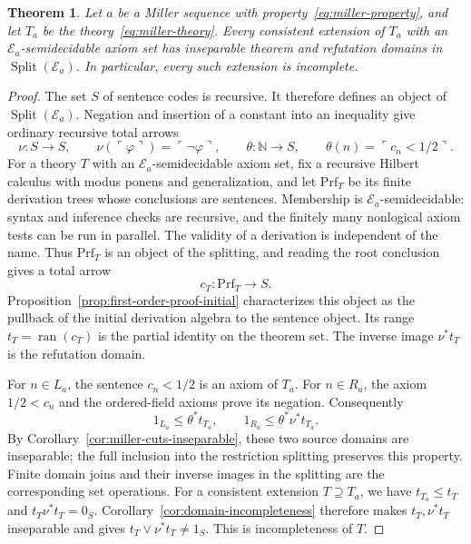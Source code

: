 \documentclass[11pt]{article}
\newtheorem{theorem}{Theorem}[section]
\newcommand{\N}{\mathbb N}
\newcommand{\ran}{\operatorname{ran}}
\begin{document}
\begin{theorem}\label{thm:miller-incompleteness}
Let $a$ be a Miller sequence with property~\eqref{eq:miller-property},
and let $T_a$ be the theory~\eqref{eq:miller-theory}.
Every consistent extension of $T_a$ with an
$\mathcal E_a$-semidecidable axiom set has inseparable theorem and
refutation domains in $\operatorname{Split}(\mathcal E_a)$.
In particular, every such extension is incomplete.
\end{theorem}
\begin{proof}
The set $S$ of sentence codes is recursive. It therefore defines an
object of $\operatorname{Split}(\mathcal E_a)$. Negation and insertion
of a constant into an inequality give ordinary recursive total arrows
\[
 \nu:S\to S,\qquad
 \nu(\ulcorner\varphi\urcorner)=\ulcorner\neg\varphi\urcorner,
 \qquad
 \theta:\N\to S,\qquad
 \theta(n)=\ulcorner c_n<1/2\urcorner.
\]
For a theory $T$ with an $\mathcal E_a$-semidecidable axiom set,
fix a recursive Hilbert calculus with modus ponens and generalization,
and let $\mathrm{Prf}_T$ be its finite derivation trees whose conclusions
are sentences. Membership is
$\mathcal E_a$-semidecidable: syntax and inference checks are recursive,
and the finitely many nonlogical axiom tests can be run in parallel.
The validity of a derivation is independent of the name. Thus
$\mathrm{Prf}_T$ is an object of the splitting, and reading the root
conclusion gives a total arrow
\[
 c_T:\mathrm{Prf}_T\to S.
\]
Proposition~\ref{prop:first-order-proof-initial} characterizes this object
as the pullback of the initial derivation algebra to the sentence object.
Its range $t_T=\ran(c_T)$ is the partial identity on the theorem set.
The inverse image $\nu^*t_T$ is the refutation domain.

For $n\in L_a$, the sentence $c_n<1/2$ is an axiom of $T_a$.
For $n\in R_a$, the axiom $1/2<c_n$ and the ordered-field axioms
prove its negation. Consequently
\[
 1_{L_a}\le\theta^*t_{T_a},\qquad
 1_{R_a}\le\theta^*\nu^*t_{T_a}.
\]
By Corollary~\ref{cor:miller-cuts-inseparable}, these two source domains
are inseparable; the full inclusion into the restriction splitting
preserves this property. Finite domain joins and their inverse
images in the splitting are the corresponding set operations.
For a consistent extension $T\supseteq T_a$, we have
$t_{T_a}\le t_T$ and $t_T\nu^*t_T=0_S$.
Corollary~\ref{cor:domain-incompleteness} therefore makes
$t_T,\nu^*t_T$ inseparable and gives
$t_T\vee\nu^*t_T\ne1_S$. This is incompleteness of $T$.
\end{proof}
\end{document}

